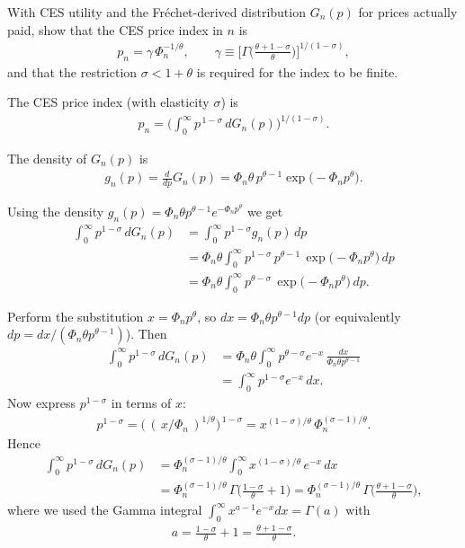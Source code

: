 
With CES utility and the Fréchet-derived distribution $G_n(p)$ for prices actually paid, show that the CES price index in $n$ is
\begin{align*}
p_n = \gamma\, \Phi_n^{-1/\theta}, \qquad
\gamma \equiv \Bigg[\Gamma\!\Big(\frac{\theta+1-\sigma}{\theta}\Big)\Bigg]^{\!1/(1-\sigma)},
\end{align*}
and that the restriction $\sigma<1+\theta$ is required for the index to be finite.


\begin{solution}
The CES price index (with elasticity $\sigma$) is
\begin{align*}
p_n = \Bigg(\int_0^\infty p^{\,1-\sigma}\, dG_n(p)\Bigg)^{\!1/(1-\sigma)}.
\end{align*}

The density of $G_n(p)$ is
\begin{align*}
g_n(p) = \frac{d}{dp}G_n(p) = \Phi_n \theta\, p^{\theta-1} \exp\!\big(-\Phi_n p^{\theta}\big).
\end{align*}

Using the density $g_n(p)=\Phi_n\theta p^{\theta-1}e^{-\Phi_n p^{\theta}}$ we get
\begin{align*}
\int_0^\infty p^{1-\sigma}\, dG_n(p)
&= \int_0^\infty p^{1-\sigma} g_n(p)\, dp \\
&= \Phi_n \theta \int_0^\infty p^{1-\sigma}\, p^{\theta-1}\,
    \exp\!\big(-\Phi_n p^{\theta}\big)\, dp \\
&= \Phi_n \theta \int_0^\infty p^{\theta-\sigma}\,
    \exp\!\big(-\Phi_n p^{\theta}\big)\, dp.
\end{align*}

Perform the substitution $x=\Phi_n p^{\theta}$, so $dx=\Phi_n\theta p^{\theta-1}dp$ (or equivalently $dp=dx/(\Phi_n\theta p^{\theta-1})$). Then
\begin{align*}
\int_0^\infty p^{1-\sigma}\, dG_n(p)
&= \Phi_n \theta \int_0^\infty p^{\theta-\sigma} e^{-x}\, \frac{dx}{\Phi_n\theta p^{\theta-1}} \\
&= \int_0^\infty p^{1-\sigma} e^{-x}\, dx.
\end{align*}
Now express $p^{1-\sigma}$ in terms of $x$:
\begin{align*}
p^{1-\sigma} = \big(\,(\,x/\Phi_n\,)^{1/\theta}\big)^{\,1-\sigma}
= x^{(1-\sigma)/\theta}\, \Phi_n^{(\sigma-1)/\theta}.
\end{align*}
Hence
\begin{align*}
\int_0^\infty p^{1-\sigma}\, dG_n(p)
&= \Phi_n^{(\sigma-1)/\theta} \int_0^\infty x^{(1-\sigma)/\theta}\, e^{-x}\, dx \\
&= \Phi_n^{(\sigma-1)/\theta}\, \Gamma\!\Big(\frac{1-\sigma}{\theta}+1\Big)
= \Phi_n^{(\sigma-1)/\theta}\, \Gamma\!\Big(\frac{\theta+1-\sigma}{\theta}\Big),
\end{align*}
where we used the Gamma integral $\displaystyle\int_0^\infty x^{a-1}e^{-x}dx=\Gamma(a)$ with
\begin{align*}
a = \frac{1-\sigma}{\theta}+1 = \frac{\theta+1-\sigma}{\theta}.
\end{align*}


\end{solution}
